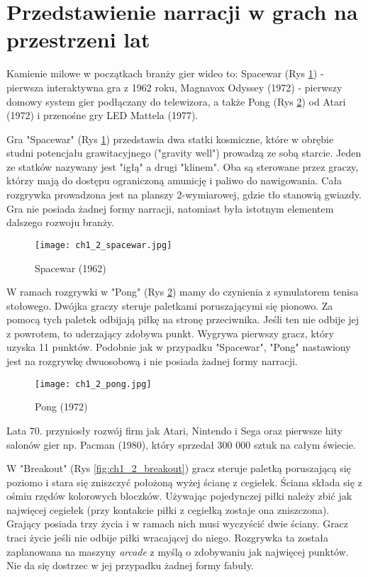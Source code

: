 \newpage

\section{Przedstawienie narracji w grach na przestrzeni lat}\label{subsection:ch1_2}

Kamienie milowe w początkach branży gier wideo to: Spacewar (Rys \ref{fig:ch1_2_spacewar}) - pierwsza interaktywna gra z
1962 roku, Magnavox Odyssey (1972) - pierwszy domowy system gier podłączany do telewizora, a
także Pong (Rys \ref{fig:ch1_2_pong}) od Atari (1972) i przenośne gry LED Mattela (1977)\cite{the_evolution_of_video_games}.

Gra "Spacewar" (Rys \ref{fig:ch1_2_spacewar}) przedstawia dwa statki kosmiczne, które w obrębie studni potencjału grawitacyjnego ("gravity well")
prowadzą ze sobą starcie. Jeden ze statków nazywany jest "igłą" a drugi "klinem". Oba są sterowane przez
graczy, którzy mają do dostępu ograniczoną amunicję i paliwo do nawigowania. Cała rozgrywka prowadzona jest
na planszy 2-wymiarowej, gdzie tło stanowią gwiazdy. Gra nie posiada żadnej formy narracji, natomiast była
istotnym elementem dalszego rozwoju branży.

\begin{figure}[h]
    \centering
    \texttt{[image: ch1\_2\_spacewar.jpg]}
    \caption{Spacewar (1962)}
    \label{fig:ch1_2_spacewar}
\end{figure}

W ramach rozgrywki w "Pong" (Rys \ref{fig:ch1_2_pong}) mamy do czynienia z symulatorem tenisa stołowego. Dwójka graczy steruje paletkami
poruszającymi się pionowo. Za pomocą tych paletek odbijają piłkę na stronę przeciwnika. Jeśli ten nie odbije
jej z powrotem, to uderzający zdobywa punkt. Wygrywa pierwszy gracz, który uzyska 11 punktów. Podobnie jak
w przypadku "Spacewar", "Pong" nastawiony jest na rozgrywkę dwuosobową i nie posiada żadnej formy narracji.

\begin{figure}[h]
    \centering
    \texttt{[image: ch1\_2\_pong.jpg]}
    \caption{Pong (1972)}
    \label{fig:ch1_2_pong}
\end{figure}

Lata 70. przyniosły rozwój firm jak Atari, Nintendo i Sega oraz pierwsze hity salonów
gier np. Pacman (1980), który sprzedał 300 000 sztuk na całym świecie\cite{the_evolution_of_video_games}.

W "Breakout" (Rys \ref{fig:ch1_2_breakout}) gracz steruje paletką poruszającą się poziomo i stara się zniszczyć położoną wyżej ścianę
z cegiełek. Ściana składa się z ośmiu rzędów kolorowych bloczków. Używając pojedynczej piłki należy
zbić jak najwięcej cegiełek (przy kontakcie piłki z cegiełką zostaje ona zniszczona). Grający posiada
trzy życia i w ramach nich musi wyczyścić dwie ściany. Gracz traci życie jeśli nie odbije piłki wracającej
do niego. Rozgrywka ta została zaplanowana na maszyny \textit{arcade} z myślą o zdobywaniu jak najwięcej
punktów. Nie da się dostrzec w jej przypadku żadnej formy fabuły.

